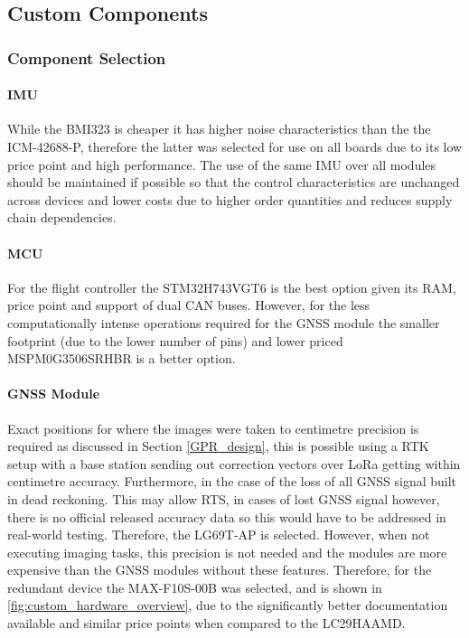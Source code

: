 \subsection{Custom Components}\label{sub_sub_section:tgt_custom_components}

\subsubsection{Component Selection}\label{sub_sub_section:tgt_component_selection}

\paragraph{\gls{IMU}}
While the BMI323 is cheaper it has higher noise characteristics than the the ICM-42688-P, therefore the latter was selected for use on all boards due to its low price point and high performance. The use of the same \gls{IMU} over all modules should be maintained if possible so that the control characteristics are unchanged across devices and lower costs due to higher order quantities and reduces supply chain dependencies.
\paragraph{\gls{MCU}}

For the flight controller the STM32H743VGT6 is the best option given its \gls{RAM}, price point and support of dual \gls{CAN} buses. However, for the less computationally intense operations required for the \gls{GNSS} module the smaller footprint (due to the lower number of pins) and lower priced MSPM0G3506SRHBR is a better option.
\paragraph{\gls{GNSS} Module}

Exact positions for where the images were taken to centimetre precision is required as discussed in Section \ref{GPR_design}, this is possible using a \gls{RTK} setup with a base station sending out correction vectors over LoRa getting within centimetre accuracy\cite{RTK_LORA}. Furthermore, in the case of the loss of all \gls{GNSS} signal built in dead reckoning. This may allow \gls{RTS}, in cases of lost \gls{GNSS} signal however, there is no official released accuracy data so this would have to be addressed in real-world testing. Therefore, the LG69T-AP is selected. However, when not executing imaging tasks, this precision is not needed and the modules are more expensive than the \gls{GNSS} modules without these features. Therefore, for the redundant device the MAX-F10S-00B was selected, and is shown in \ref{fig:custom_hardware_overview}, due to the significantly better documentation available and similar price points when compared to the LC29HAAMD.

